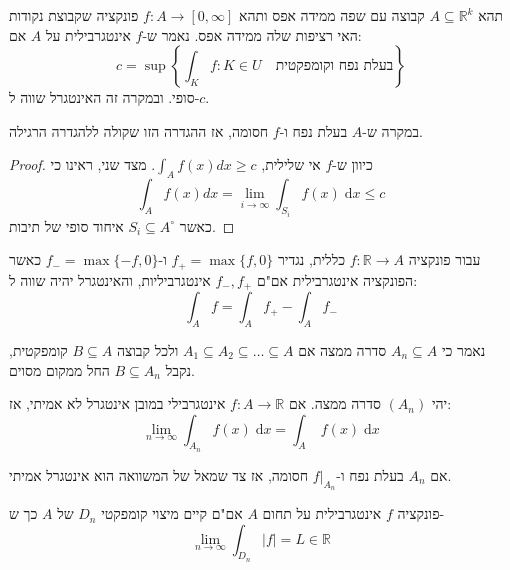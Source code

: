 \documentclass{tstextbook}
\begin{document}
\begin{definition}
תהא \(A\subseteq \mathbb{R}^k\) קבוצה עם שפה ממידה אפס ותהא \(f:A\to\left[ 0,\infty \right]\) פונקציה שקבוצת נקודות האי רציפות שלה ממידה אפס. נאמר ש-\(f\) אינטגרבילית על \(A\) אם:
$$c=\operatorname*{sup}\left\lbrace\int_{K}f:K\in U\quad {\text{בעלת נפח וקומפקטית}}\right\rbrace $$
סופי. ובמקרה זה האינטגרל שווה ל-\(c\).

\end{definition}
\begin{proposition}
במקרה ש-\(A\) בעלת נפח ו-\(f\) חסומה, אז ההגדרה הזו שקולה ללהגדרה הרגילה.

\end{proposition}
\begin{proof}
כיוון ש-\(f\) אי שלילית, \(\int_{A}f(x)dx\geq c\). מצד שני, ראינו כי
$$\int_{A}f(x)dx=\lim_{ i \to \infty }\int_{S_{i}}f(x)\;\mathrm{d}x\leq c$$
כאשר \(S_{i}\subseteq A^\circ\) איחוד סופי של תיבות.

\end{proof}
\begin{definition}
עבור פונקציה \(f:\mathbb{R}\to A\) כללית, נגדיר \(f_{+}=\max\{ f,0 \}\) ו-\(f_{-}=\max\{ -f,0 \}\) כאשר הפונקציה אינטגרבילית אם"ם \(f_{-},f_{+}\) אינטגרביליות, והאינטגרל יהיה שווה ל:
$$\int_{A}f=\int_{A}f_{+}-\int_{A}f_{-}$$

\end{definition}
\begin{definition}
נאמר כי \(A_{n}\subseteq A\) סדרה ממצה אם \(A_{1}\subseteq A_{2} \subseteq \dots \subseteq A\) ולכל קבוצה \(B\subseteq A\) קומפקטית, נקבל \(B \subseteq A_{n}\) החל ממקום מסוים. 

\end{definition}
\begin{proposition}
יהי \((A_{n})\) סדרה ממצה. אם \(f:A\to \mathbb{R}\) אינטגרבילי במובן אינטגרל לא אמיתי, אז:
$$\lim_{ n \to \infty } \int_{A_{n}}f(x)\;\mathrm{d}x=\int_{A} \;f(x)\;\mathrm{d}x$$

\end{proposition}
\begin{remark}
אם \(A_{n}\) בעלת נפח ו-\(f|_{A_{n}}\) חסומה, אז צד שמאל של המשוואה הוא אינטגרל אמיתי.

\end{remark}
\begin{proposition}
פונקציה \(f\) אינטגרבילית על תחום \(A\) אם"ם קיים מיצוי קומפקטי \(D_{n}\) של \(A\) כך ש-
$$\operatorname*{lim}_{n\to\infty}\int_{D_{n}}|f|=L\in\mathbb{R}$$

\end{proposition}
\end{document}
